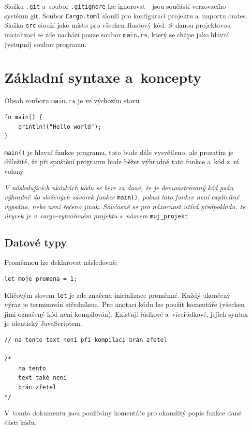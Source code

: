 \documentclass[a4paper, 12pt, twoside]{article} %
\newcommand{\rust}[1]{\texttt{#1}}
\begin{document}
			Složku \texttt{.git} a~soubor \texttt{.gitignore} lze ignorovat -  jsou součástí verzovacího systému git. Soubor \texttt{Cargo.toml} slouží pro konfiguraci projektu a~importu crates. Složka \texttt{src} slouží jako místo pro všechen Rustový kód. S~danou projektovou inicializací se zde nachází pouze soubor \texttt{main.rs}, který se chápe jako hlavní (vstupní) soubor programu.

\section{Základní syntaxe a~koncepty}
		Obsah souboru \texttt{main.rs} je ve výchozím stavu
		\begin{verbatim}
fn main() {
	println!("Hello world");
}
		\end{verbatim}

		\rust{main()} je hlavní funkce programu, toto bude dále vysvětleno, ale prozatím je důležité, že při spuštění programu bude běžet výhradně tato funkce a~kód z~ní volaný.
		
		\begin{center}
			\textit{V následujících ukázkách kódu se bere za dané, že je demonstrovaný kód psán výhradně do složených závorek funkce }\rust{main()}\textit{, pokud tato funkce není explicitně vypsána, nebo není řečeno jinak. Současně se pro názornost užívá předpokladu, že úryvek je v~cargo-vytvořeném projektu s~názvem }\texttt{muj\_projekt}
		\end{center}

	\subsection{Datové typy}
		Proměnnou lze deklarovat následovně:
		\begin{verbatim}
let moje_promena = 1;
		\end{verbatim}
		
		Klíčovým slovem \rust{let} je zde značena inicializace proměnné. Každý ukončený výraz je terminován středníkem. Pro anotaci kódu lze použít komentáře (všechen jimi označený kód není kompilován). Existují řádkové a~víceřádkové, jejich syntax je identický JavaScriptem.
		\begin{verbatim}
// na tento text není při kompilaci brán zřetel

/*
	na tento
	text také není
	brán zřetel
*/
		\end{verbatim}
		
		V~tomto dokumentu jsou používány komentáře pro okamžitý popis funkce dané části kódu.
\end{document}
